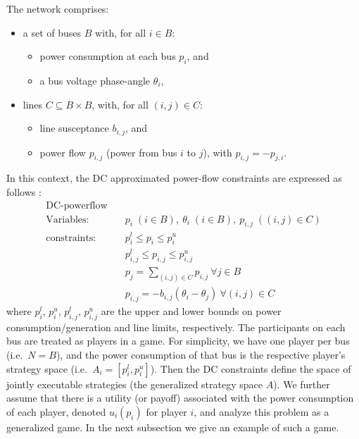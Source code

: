 The network comprises:
\begin{itemize}
    \item a set of buses $B$ with, for all $i\in B$:
    \begin{itemize} 
        \item power consumption at each bus $p_i$, and 
        \item a bus voltage phase-angle $\theta_i$,
    \end{itemize}
    \item lines 
    $C\subseteq B\times B$, with, for all $(i,j)\in C$: 
        \begin{itemize} 
        \item line susceptance $b_{i,j}$, and 
        \item power flow $p_{i,j}$ (power from bus $i$ to $j$), with $p_{i,j}=-p_{j,i}$. 
    \end{itemize}
\end{itemize}
In this context, the DC approximated power-flow constraints are expressed as follows \cite{Wang1}:
\begin{equation}
\label{dcopf1}
\begin{aligned}
\text{DC-powerflow} \quad& \\
\text{Variables:} \quad&  p_i\; (i\in B),\ \theta_i\; (i\in B),\ p_{i,j}\; ((i,j)\in C) \\
\text{constraints:} \quad& p_i^{l}\le p_i \le p_i^{u} \\
&p_{i,j}^l \le p_{i,j} \le p_{i,j}^u \\
&p_j = \sum_{(i,j)\in C}p_{i,j}~\forall j\in B\\
&p_{i,j} = -b_{i,j}(\theta_i - \theta_j) ~\forall(i,j)\in C
\end{aligned}
\end{equation}
where $p_i^{l}$, $p_i^{u}$, $p_{i,j}^l$, $p_{i,j}^u$ are the upper and lower bounds on power consumption/generation and line limits, respectively.
The participants on each bus are treated as players in a game.
For simplicity, we have one player per bus (i.e.~$N=B$), and the power consumption of that bus is the respective player's strategy space (i.e.\ $A_i=[p_i^l,p_i^u]$).
Then the DC constraints define the space of jointly executable strategies (the generalized strategy space $A$). 
We further assume that there is a utility (or payoff) associated with the power consumption of each player, denoted $u_i(p_i)$ for player $i$,
and analyze this problem as a generalized game.
In the next subsection we give an example of such a game.



